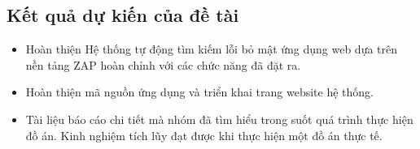 \subsection*{Kết quả dự kiến của đề tài}
\begin{itemize}
    \item Hoàn thiện Hệ thống tự động tìm kiếm lỗi bỏ mật ứng dụng web dựa trên nền tảng ZAP hoàn chỉnh với các chức năng đã đặt ra.
    \item Hoàn thiện mã nguồn ứng dụng và triển khai trang website hệ thống.
    \item Tài liệu báo cáo chi tiết mà nhóm đã tìm hiểu trong suốt quá trình thực hiện đồ án. Kinh nghiệm tích lũy đạt được khi thực hiện một đồ án thực tế.
\end{itemize}